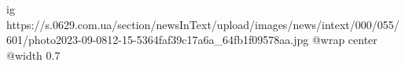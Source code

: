  
 
 
 
 

\ifcmt
  ig https://s.0629.com.ua/section/newsInText/upload/images/news/intext/000/055/601/photo2023-09-0812-15-5364faf39c17a6a_64fb1f09578aa.jpg
  @wrap center
  @width 0.7
\fi
